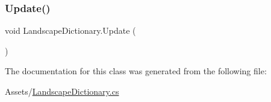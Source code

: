 \subsubsection{\texorpdfstring{Update()}{Update()}}
{\footnotesize\ttfamily void Landscape\+Dictionary.\+Update (\begin{DoxyParamCaption}{ }\end{DoxyParamCaption})\hspace{0.3cm}{\ttfamily [private]}}



The documentation for this class was generated from the following file\+:\begin{DoxyCompactItemize}
\item 
Assets/\hyperlink{_landscape_dictionary_8cs}{Landscape\+Dictionary.\+cs}\end{DoxyCompactItemize}
